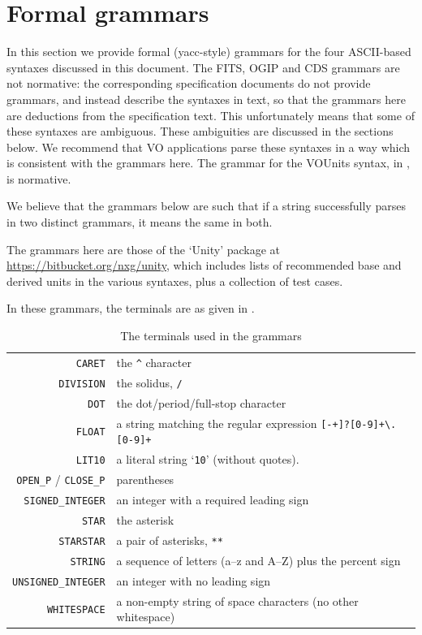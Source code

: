 \documentclass[11pt,notitlepage,onecolumn]{ivoa}
\begin{document}
\section{Formal grammars\label{appx:grammar}}

In this section we provide formal (yacc-style) grammars for the four
ASCII-based syntaxes discussed in this document.  The FITS, OGIP and
CDS grammars are not normative: the corresponding specification
documents do not provide grammars, and instead describe the syntaxes
in text, so that the grammars here are deductions from the
specification text.
This unfortunately means that some of these syntaxes are ambiguous.
These ambiguities are discussed in the sections below.  We recommend
that VO applications parse these syntaxes in a way which is consistent
with the grammars here.
%
The grammar for the VOUnits syntax, in , is normative.

We believe that the grammars below are such that if a string 
successfully parses in two distinct grammars, it means the same in
both.

The grammars here are those of the `Unity' package at
\url{https://bitbucket.org/nxg/unity}, which includes lists of
recommended base and derived units in the various syntaxes, plus a
collection of test cases.

In these grammars, the terminals are as given in
.
\begin{table}
\begin{tabular}{rp{9cm}}
\texttt{CARET}&the \texttt{\^{}} character\tabularnewline
\texttt{DIVISION}&the solidus, \texttt{/}\tabularnewline
\texttt{DOT}&the dot/period/full-stop character\tabularnewline
\texttt{FLOAT}&a string matching the regular expression
       \texttt{[-+]?[0-9]+\textbackslash.[0-9]+}\raggedright\tabularnewline
\texttt{LIT10}&a literal string `\texttt{10}' (without quotes).\tabularnewline
\texttt{OPEN\_P} / \texttt{CLOSE\_P}&parentheses\tabularnewline
\texttt{SIGNED\_INTEGER}&an integer with a required leading sign\raggedright\tabularnewline
\texttt{STAR}&the asterisk\tabularnewline
\texttt{STARSTAR}&a pair of asterisks, \texttt{**}\tabularnewline
\texttt{STRING}&a sequence of letters (a--z and A--Z) plus the percent sign\raggedright\tabularnewline
\texttt{UNSIGNED\_INTEGER}&an integer with no leading sign\raggedright\tabularnewline
\texttt{WHITESPACE}&a non-empty string of space characters (no other whitespace)\raggedright\tabularnewline
\end{tabular}
\caption{\label{tabx:terminals}The terminals used in the grammars}
\end{table}
\end{document}
